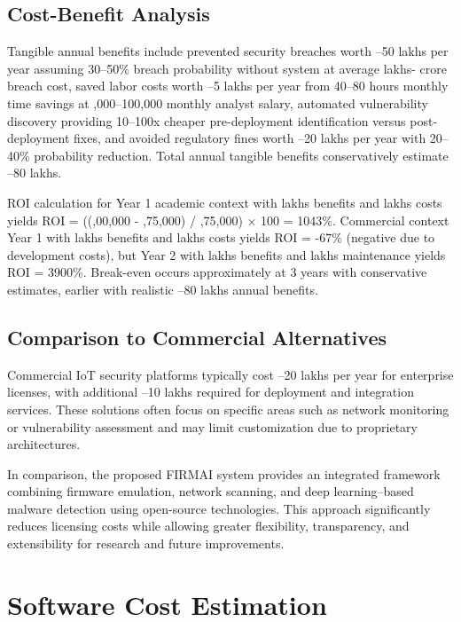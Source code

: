 \subsection{Cost-Benefit Analysis}

Tangible annual benefits include prevented security breaches worth --50 lakhs per year assuming 30--50\% breach probability without system at average  lakhs- crore breach cost, saved labor costs worth --5 lakhs per year from 40--80 hours monthly time savings at ,000--100,000 monthly analyst salary, automated vulnerability discovery providing 10--100x cheaper pre-deployment identification versus post-deployment fixes, and avoided regulatory fines worth --20 lakhs per year with 20--40\% probability reduction. Total annual tangible benefits conservatively estimate --80 lakhs.

ROI calculation for Year 1 academic context with  lakhs benefits and  lakhs costs yields ROI = ((,00,000 - ,75,000) / ,75,000) $\times$ 100 = 1043\%. Commercial context Year 1 with  lakhs benefits and  lakhs costs yields ROI = -67\% (negative due to development costs), but Year 2 with  lakhs benefits and  lakhs maintenance yields ROI = 3900\%. Break-even occurs approximately at 3 years with conservative estimates, earlier with realistic --80 lakhs annual benefits.

\subsection{Comparison to Commercial Alternatives}

Commercial IoT security platforms typically cost --20 lakhs per year for enterprise licenses, with additional --10 lakhs required for deployment and integration services. These solutions often focus on specific areas such as network monitoring or vulnerability assessment and may limit customization due to proprietary architectures.

In comparison, the proposed FIRMAI system provides an integrated framework combining firmware emulation, network scanning, and deep learning–based malware detection using open-source technologies. This approach significantly reduces licensing costs while allowing greater flexibility, transparency, and extensibility for research and future improvements.
\section{Software Cost Estimation}


